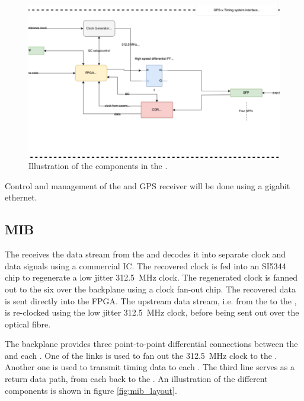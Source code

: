 \documentclass{article}
\begin{document}
\begin{figure}[h]
\includegraphics[width=\textwidth]{gib_layout.pdf}
\caption{Illustration of the components in the .}
\label{fig:gib_layout}
\end{figure}

Control and management of the  and GPS receiver will be done using a gigabit ethernet.
\subsection{MIB}
The  receives the  data stream from the  and decodes it into separate clock and data signals using a commercial  IC. The recovered clock is fed into an SI5344 chip to regenerate a low jitter \SI{312.5}{\MHz} clock. The regenerated clock is fanned out to the six  over the  backplane using a clock fan-out chip. The recovered data is sent directly into the  FPGA. The upstream data stream, i.e. from the  to the , is re-clocked using the low jitter \SI{312.5}{\MHz} clock, before being sent out over the optical fibre.

The  backplane provides three point-to-point differential connections between the  and each . One of the links is used to fan out the \SI{312.5}{\MHz} clock to the . Another one is used to transmit  timing data to each . The third line serves as a return data path, from each  back to the . An illustration of the different  components is shown in figure \ref{fig:mib_layout}.
\end{document}
